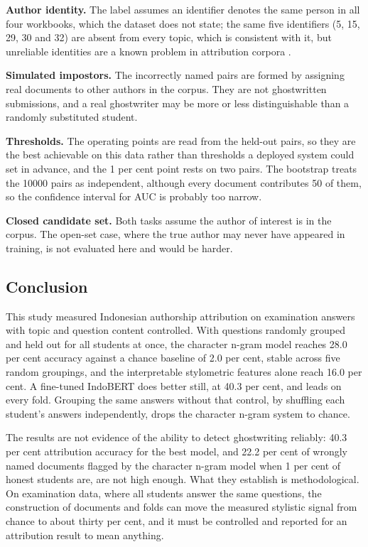 \documentclass[runningheads]{llncs}
\begin{document}
\textbf{Author identity.} The label assumes an identifier denotes the same person in all four workbooks, which the dataset does not state; the same five identifiers (5, 15, 29, 30 and 32) are absent from every topic, which is consistent with it, but unreliable identities are a known problem in attribution corpora \cite{Bogomolov2021}.

\textbf{Simulated impostors.} The incorrectly named pairs are formed by assigning real documents to other authors in the corpus. They are not ghostwritten submissions, and a real ghostwriter may be more or less distinguishable than a randomly substituted student.

\textbf{Thresholds.} The operating points are read from the held-out pairs, so they are the best achievable on this data rather than thresholds a deployed system could set in advance, and the 1 per cent point rests on two pairs. The bootstrap treats the 10000 pairs as independent, although every document contributes 50 of them, so the confidence interval for AUC is probably too narrow.

\textbf{Closed candidate set.} Both tasks assume the author of interest is in the corpus. The open-set case, where the true author may never have appeared in training, is not evaluated here and would be harder.

\subsection{Conclusion}

This study measured Indonesian authorship attribution on examination answers with topic and question content controlled. With questions randomly grouped and held out for all students at once, the character n-gram model reaches 28.0 per cent accuracy against a chance baseline of 2.0 per cent, stable across five random groupings, and the interpretable stylometric features alone reach 16.0 per cent. A fine-tuned IndoBERT does better still, at 40.3 per cent, and leads on every fold. Grouping the same answers without that control, by shuffling each student's answers independently, drops the character n-gram system to chance.

The results are not evidence of the ability to detect ghostwriting reliably: 40.3 per cent attribution accuracy for the best model, and 22.2 per cent of wrongly named documents flagged by the character n-gram model when 1 per cent of honest students are, are not high enough. What they establish is methodological. On examination data, where all students answer the same questions, the construction of documents and folds can move the measured stylistic signal from chance to about thirty per cent, and it must be controlled and reported for an attribution result to mean anything.
\end{document}
